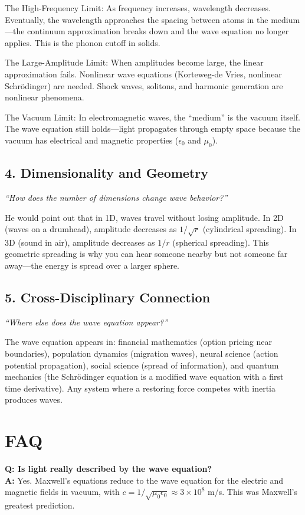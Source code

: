 The High-Frequency Limit: As frequency increases, wavelength decreases. Eventually, the wavelength approaches the spacing between atoms in the medium---the continuum approximation breaks down and the wave equation no longer applies. This is the phonon cutoff in solids.

The Large-Amplitude Limit: When amplitudes become large, the linear approximation fails. Nonlinear wave equations (Korteweg-de Vries, nonlinear Schr\"odinger) are needed. Shock waves, solitons, and harmonic generation are nonlinear phenomena.

The Vacuum Limit: In electromagnetic waves, the ``medium'' is the vacuum itself. The wave equation still holds---light propagates through empty space because the vacuum has electrical and magnetic properties ($\epsilon_0$ and $\mu_0$).

\subsection*{4. Dimensionality and Geometry}
\textit{``How does the number of dimensions change wave behavior?''}

He would point out that in 1D, waves travel without losing amplitude. In 2D (waves on a drumhead), amplitude decreases as $1/\sqrt{r}$ (cylindrical spreading). In 3D (sound in air), amplitude decreases as $1/r$ (spherical spreading). This geometric spreading is why you can hear someone nearby but not someone far away---the energy is spread over a larger sphere.

\subsection*{5. Cross-Disciplinary Connection}
\textit{``Where else does the wave equation appear?''}

The wave equation appears in: financial mathematics (option pricing near boundaries), population dynamics (migration waves), neural science (action potential propagation), social science (spread of information), and quantum mechanics (the Schr\"odinger equation is a modified wave equation with a first time derivative). Any system where a restoring force competes with inertia produces waves.
\section*{FAQ}

\textbf{Q: Is light really described by the wave equation?}\\
\textbf{A:} Yes. Maxwell's equations reduce to the wave equation for the electric and magnetic fields in vacuum, with $c = 1/\sqrt{\mu_0 \epsilon_0} \approx 3 \times 10^8$ m/s. This was Maxwell's greatest prediction.

